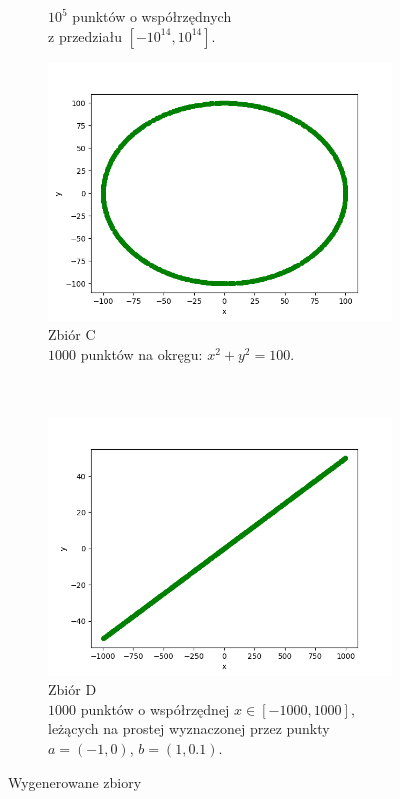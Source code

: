 \documentclass[11pt,a4paper]{article}
\begin{document}
\begin{figure}[H]
\begin{subfigure}[b]{0.46\textwidth}
{            \footnotesize$10^5$ punktów o współrzędnych
            \\
            z przedziału $[-10^{14}, 10^{14}]$.
        }
    \end{subfigure}
    \begin{subfigure}[b]{0.46\textwidth}
        \centering
        \includegraphics[scale=0.5]{res/cir.png}
        \caption{
            Zbiór C
            \\
            \footnotesize$1000$ punktów na okręgu: $x^2 + y^2 = 100$.
            \\
            ~
            \\
            ~
        }
    \end{subfigure}
    \begin{subfigure}[b]{0.46\textwidth}
        \centering
        \includegraphics[scale=0.5]{res/lin.png}
        \caption{
            Zbiór D
            \\
            \footnotesize$1000$ punktów o współrzędnej $x\in[-1000, 1000]$,
            \\
            leżących na prostej wyznaczonej przez punkty 
            \\
            $a = (-1, 0)$, $b = (1, 0.1)$. 
        }
    \end{subfigure}
    \caption{Wygenerowane zbiory}
\end{figure}
\end{document}
